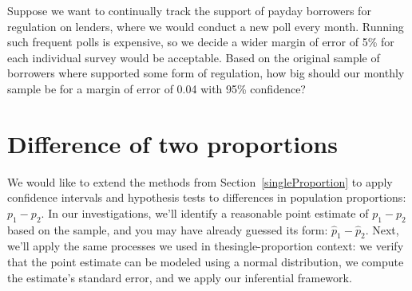 
\begin{exercisewrap}
\begin{nexercise}
Suppose we want to continually track the support
of payday borrowers for regulation on lenders,
where we would conduct a new poll every month.
Running such frequent polls is expensive, so we decide
a wider margin of error of 5\% for each individual survey
would be acceptable.
Based on the original sample of borrowers where
\paydayRegPerc{} supported some form of regulation,
how big should our monthly sample be for a margin
of error of 0.04 with 95\% confidence?\footnotemark
\end{nexercise}
\end{exercisewrap}


{}





\section{Difference of two proportions}
\label{differenceOfTwoProportions}

We would like to extend the methods from
Section~\ref{singleProportion}
to apply confidence intervals and hypothesis tests
to differences in population proportions:
\mbox{$p_1 - p_2$}.
In our investigations, we'll identify a reasonable
point estimate of $p_1 - p_2$ based on the sample,
and you may have already guessed its form:
$\hat{p}_1 - \hat{p}_2$.
%
Next, we'll apply the same processes we used in
thesingle-proportion context:
we verify that the point estimate
can be modeled using a normal distribution,
we compute the estimate's standard error, and
we apply our inferential framework.


